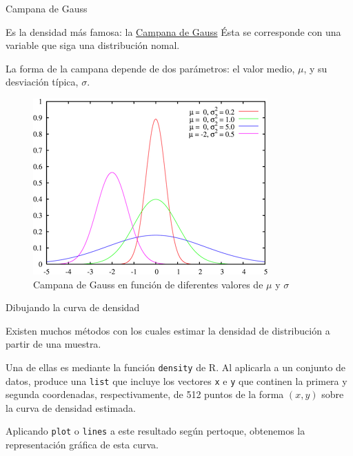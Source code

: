 \documentclass[
  ignorenonframetext,
]{beamer}
\begin{document}
\begin{frame}{Campana de Gauss}
\protect\hypertarget{campana-de-gauss}{}

Es la densidad más famosa: la
\href{https://es.wikipedia.org/wiki/Función_gaussiana}{Campana de Gauss}
Ésta se corresponde con una variable que siga una distribución nomal.

La forma de la campana depende de dos parámetros: el valor medio,
\(\mu\), y su desviación típica, \(\sigma\).

\begin{figure}
\centering
\includegraphics{Imgs/gauss.png}
\caption{Campana de Gauss en función de diferentes valores de \(\mu\) y
\(\sigma\)}
\end{figure}

\end{frame}

\begin{frame}[fragile]{Dibujando la curva de densidad}
\protect\hypertarget{dibujando-la-curva-de-densidad}{}

Existen muchos métodos con los cuales estimar la densidad de
distribución a partir de una muestra.

Una de ellas es mediante la función \texttt{density} de R. Al aplicarla
a un conjunto de datos, produce una \texttt{list} que incluye los
vectores \texttt{x} e \texttt{y} que continen la primera y segunda
coordenadas, respectivamente, de 512 puntos de la forma \((x,y)\) sobre
la curva de densidad estimada.

Aplicando \texttt{plot} o \texttt{lines} a este resultado según
pertoque, obtenemos la representación gráfica de esta curva.

\end{frame}
\end{document}

